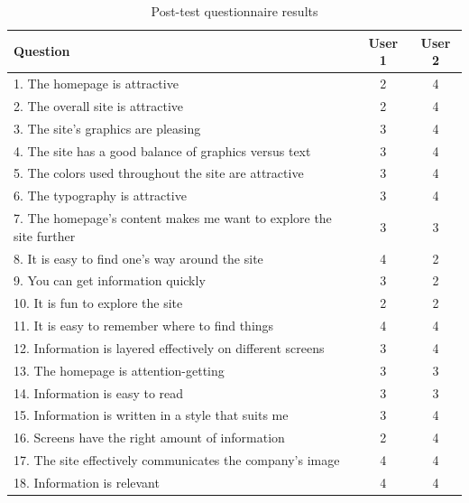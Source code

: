 \documentclass[a4paper]{article}
\begin{document}
\begin{table}[H]
\caption{Post-test questionnaire results}
\label{table:post-test_results}
\begin{center}
\footnotesize
{}
\begin{tabular}{p{30em}| c | c }
\hline
\textbf{Question} & \textbf{User 1} & \textbf{User 2} \\
\hline
1. The homepage is attractive                            &  2  & 4 \\
2. The overall site is attractive                        &  2  & 4  \\     
3. The site's graphics are pleasing                      &  3  & 4    \\
4. The site has a good balance of graphics versus text   &  3  & 4    \\
5. The colors used throughout the site are attractive    &  3  & 4    \\
6. The typography is attractive                          &  3  & 4    \\
7. The homepage’s content makes me want to explore the site further  & 3  &  3   \\
8. It is easy to find one’s way around the site                &  4  &  2   \\
9. You can get information quickly                             &  3  &  2   \\
\rowcolor{red!20}
10. It is fun to explore the site                              &  2  &  2   \\
\rowcolor{green!20}
11. It is easy to remember where to find things                &  4  &  4   \\
12. Information is layered effectively on different screens    &  3  &  4   \\
13. The homepage is attention-getting                          &  3  &  3   \\
14. Information is easy to read                                &  3  &  3   \\
15. Information is written in a style that suits me            &  3  &  4  \\
16. Screens have the right amount of information               &  2  &  4  \\
\rowcolor{green!20}
17. The site effectively communicates the company’s image      &  4  &  4   \\
\rowcolor{green!20}
18. Information is relevant                                    &  4  &  4   \\

\end{tabular}
\end{center}
\end{table}
\end{document}
